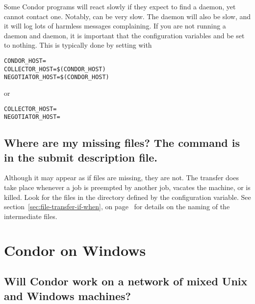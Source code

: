 Some Condor programs will react slowly if they expect to find a
 daemon, yet cannot contact one.
Notably,  can be very slow.
The  daemon will also be slow,
and it will log lots of harmless messages complaining.
If you are not running a  daemon and
 daemon,
it is important that the configuration variables
 and  be set to nothing.
This is typically done by setting  with
\footnotesize
\begin{verbatim}
CONDOR_HOST=
COLLECTOR_HOST=$(CONDOR_HOST)
NEGOTIATOR_HOST=$(CONDOR_HOST)
\end{verbatim}
\normalsize
or
\footnotesize
\begin{verbatim}
COLLECTOR_HOST=
NEGOTIATOR_HOST=
\end{verbatim}
\normalsize

\subsection*{Where are my missing files?  The command  is in the submit description file.}
Although it may appear as if files are missing,
they are not.
The transfer does take place whenever a job is 
preempted by another job, vacates the machine, or is killed.
Look for the files in the directory defined by
the  configuration variable.
See
section~\ref{sec:file-transfer-if-when}, on
page~\pageref{sec:file-transferr-if-when} for details on the naming
of the intermediate files.


\section{Condor on Windows}

\subsection*{Will Condor work on a network of mixed Unix and Windows machines?}

